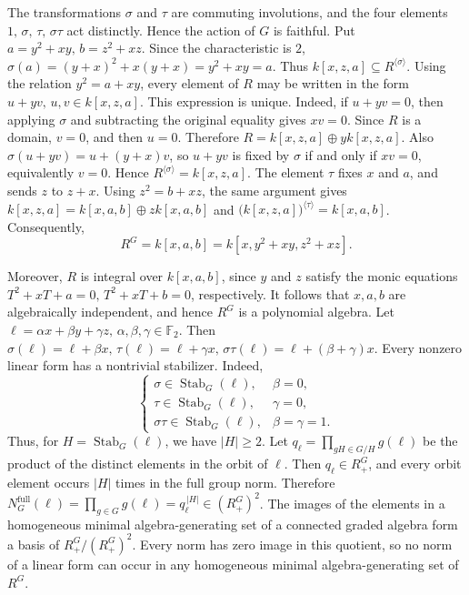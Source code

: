 \documentclass[11pt]{article}
\theoremstyle{definition}
\begin{document}
	The transformations \(\sigma\) and \(\tau\) are commuting involutions,
	and the four elements $1,\, \sigma,\, \tau,\, \sigma\tau$ act distinctly. Hence the action of \(G\) is faithful. Put $a=y^2+xy,\, b=z^2+xz$. Since the characteristic is \(2\), $\sigma(a)=(y+x)^2+x(y+x)=y^2+xy=a$. Thus $k[x,z,a]\subseteq R^{\langle\sigma\rangle}$. Using the relation $y^2=a+xy$, every element of \(R\) may be written in the form $u+yv,\, u,v\in k[x,z,a]$. This expression is unique. Indeed, if \(u+yv=0\), then applying \(\sigma\) and subtracting the original equality gives $xv=0$.
	Since \(R\) is a domain, \(v=0\), and then \(u=0\). Therefore $R=k[x,z,a]\oplus yk[x,z,a]$. Also $\sigma(u+yv)=u+(y+x)v$, so \(u+yv\) is fixed by \(\sigma\) if and only if \(xv=0\), equivalently \(v=0\). Hence
	$R^{\langle\sigma\rangle}=k[x,z,a]$. The element \(\tau\) fixes \(x\) and \(a\), and sends \(z\) to \(z+x\). Using $z^2=b+xz$, the same argument gives $k[x,z,a]=k[x,a,b]\oplus zk[x,a,b]$ and $\bigl(k[x,z,a]\bigr)^{\langle\tau\rangle} = k[x,a,b]$. Consequently,
	\[
	R^G=k[x,a,b]
	=k[x,y^2+xy,z^2+xz].
	\]
	
	Moreover, \(R\) is integral over \(k[x,a,b]\), since \(y\) and \(z\)
	satisfy the monic equations $T^2+xT+a=0, \, T^2+xT+b=0$, respectively. It follows that \(x,a,b\) are algebraically independent, and hence \(R^G\) is a polynomial algebra. Let $\ell=\alpha x+\beta y+\gamma z, \, \alpha,\beta,\gamma\in\mathbb F _2$. Then $\sigma(\ell)=\ell+\beta x,\,
	\tau(\ell)=\ell+\gamma x,\, \sigma\tau(\ell)=\ell+(\beta+\gamma)x$. Every nonzero linear form has a nontrivial stabilizer. Indeed,
	\[
	\begin{cases}
		\sigma\in\operatorname{Stab}_G(\ell),&\beta=0,\\
		\tau\in\operatorname{Stab}_G(\ell),&\gamma=0,\\
		\sigma\tau\in\operatorname{Stab}_G(\ell),&\beta=\gamma=1.
	\end{cases}
	\]
	Thus, for $H=\operatorname{Stab}_G(\ell)$, we have \(|H|\geq2\). Let $q_\ell = \prod_{gH\in G/H}g(\ell)$ be the product of the distinct elements in the orbit of \(\ell\). Then \(q_\ell\in R^G_+\), and every orbit element occurs \(|H|\) times in the full group norm. Therefore $N_G^{\mathrm{full}}(\ell)=\prod_{g\in G}g(\ell)=q_\ell^{\,|H|}\in (R^G_+)^2$. The images of the elements in a homogeneous minimal algebra-generating
	set of a connected graded algebra form a basis of $R^G_+/(R^G_+)^2$. Every norm has zero image in this quotient, so no norm of a linear form can occur in any homogeneous minimal algebra-generating set of \(R^G\).
\end{document}
